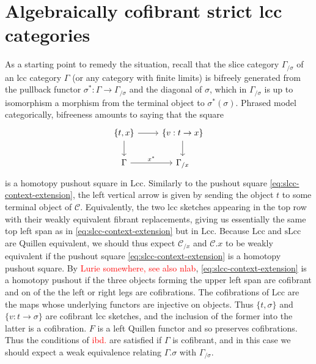 \documentclass{article}
\newcommand{\todo}[1]{\textcolor{red}{#1}}
\begin{document}
\section{Algebraically cofibrant strict lcc categories}

As a starting point to remedy the situation, recall that the slice category $\Gamma_{/ \sigma}$ of an lcc category $\Gamma$ (or any category with finite limits) is bifreely generated from the pullback functor $\sigma^* : \Gamma \rightarrow \Gamma_{/ \sigma}$ and the diagonal of $\sigma$, which in $\Gamma_{/ \sigma}$ is up to isomorphism a morphism from the terminal object to $\sigma^*(\sigma)$.
Phrased model categorically, bifreeness amounts to saying that the square
\begin{equation}
  \label{eq:homotopy-pushout-lcc}
  \begin{tikzcd}
    \{ t, x \} \arrow[r] \arrow[d] & \{ v : t \rightarrow x \} \arrow[d] \\
    \Gamma \arrow[r, "x^*"] & \Gamma_{/ x}
  \end{tikzcd}
\end{equation}
is a homotopy pushout square in $\mathrm{Lcc}$.
Similarly to the pushout square \eqref{eq:slcc-context-extension}, the left vertical arrow is given by sending the object $t$ to some terminal object of $\mathcal{C}$.
Equivalently, the two lcc sketches appearing in the top row with their weakly equivalent fibrant replacements, giving us essentially the same top left span as in \eqref{eq:slcc-context-extension} but in $\mathrm{Lcc}$.
Because $\mathrm{Lcc}$ and $\mathrm{sLcc}$ are Quillen equivalent, we should thus expect $\mathcal{C}_{/ x}$ and $\mathcal{C}.x$ to be weakly equivalent if the pushout square \eqref{eq:slcc-context-extension} is a homotopy pushout square.
By \todo{Lurie somewhere, see also nlab}, \eqref{eq:slcc-context-extension} is a homotopy pushout if the three objects forming the upper left span are cofibrant and on of the the left or right legs are cofibrations.
The cofibrations of $\mathrm{Lcc}$ are the maps whose underlying functors are injective on objects.
Thus $\{t, \sigma\}$ and $\{ v : t \rightarrow \sigma\}$ are cofibrant lcc sketches, and the inclusion of the former into the latter is a cofibration.
$F$ is a left Quillen functor and so preserves cofibrations.
Thus the conditions of \todo{ibd.} are satisfied if $\Gamma$ is cofibrant, and in this case we should expect a weak equivalence relating $\Gamma.\sigma$ with $\Gamma_{/ \sigma}$.
\end{document}
